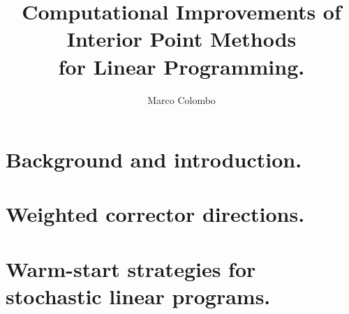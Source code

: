\documentclass[phd,draft]{msthesis}
\title{Computational Improvements of Interior Point Methods \\
       for Linear Programming.}
\author{Marco Colombo}
\begin{document}
\maketitle

\dedication{For my family and my friends.}

\standarddeclaration

%
%
\begin{abstract}
  
\end{abstract}

%
%
\begin{acknowledgements}
  
\end{acknowledgements}

%
%
\tableofcontents

%
%
\chapter{Background and introduction.}


\chapter{Weighted corrector directions.}


\chapter{Warm-start strategies for stochastic linear programs.}


%
%
%

%
%
%



%
%
\end{document}

